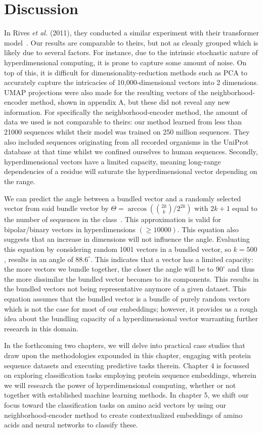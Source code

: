 \section{Discussion}\label{sec:dis3}
In Rives \textit{et al.} (2011), they conducted a similar experiment with their transformer model~\cite{esm1}. Our results are comparable to theirs, but not as cleanly grouped which is likely due to several factors. For instance, due to the intrinsic stochastic nature of hyperdimensional computing, it is prone to capture some amount of noise. On top of this, it is difficult for dimensionality-reduction methods such as PCA to accurately capture the intricacies of 10,000-dimensional vectors into 2 dimensions. UMAP projections were also made for the resulting vectors of the neighborhood-encoder method, shown in appendix A, but these did not reveal any new information. For specifically the neighborhood-encoder method, the amount of data we used is not comparable to theirs: our method learned from less than 21000 sequences whilst their model was trained on 250 million sequences. They also included sequences originating from all recorded organisms in the UniProt database at that time whilst we confined ourselves to human sequences. Secondly, hyperdimensional vectors have a limited capacity, meaning long-range dependencies of a residue will saturate the hyperdimensional vector depending on the range.

We can predict the angle between a bundled vector and a randomly selected vector from said bundle vector by $\Theta = \arccos({2k \choose k}/2^{2k})$ with $2k+1$ equal to the number of sequences in the class~\cite{sathdv}. This approximation is valid for bipolar/binary vectors in hyperdimensions $(\ge 10000)$. This equation also suggests that an increase in dimensions will not influence the angle. Evaluating this equation by considering random 1001 vectors in a bundled vector, so $k = 500$, results in an angle of $88.6^{\circ}$. This indicates that a vector has a limited capacity: the more vectors we bundle together, the closer the angle will be to $90^{\circ}$ and thus the more dissimilar the bundled vector becomes to its components. This results in the bundled vectors not being representative anymore of a given dataset. This equation assumes that the bundled vector is a bundle of purely random vectors which is not the case for most of our embeddings; however, it provides us a rough idea about the bundling capacity of a hyperdimensional vector warranting further research in this domain.

In the forthcoming two chapters, we will delve into practical case studies that draw upon the methodologies expounded in this chapter, engaging with protein sequence datasets and executing predictive tasks therein. Chapter 4 is focussed on exploring classification tasks employing protein sequence embeddings, wherein we will research the power of hyperdimensional computing, whether or not together with established machine learning methods. In chapter 5, we shift our focus toward the classification tasks on amino acid vectors by using our neighborhood-encoder method to create contextualized embeddings of amino acids and neural networks to classify these.